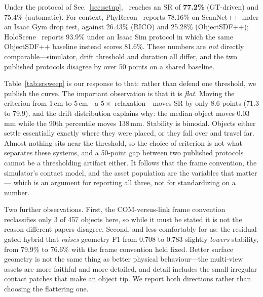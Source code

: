 \begin{table}[t]
\caption{Stability ratio vs.\ the drift threshold. The 3\,cm column is the
headline number; p50/p90 are the drift distribution's percentiles.}
\label{tab:srsweep}
\centering\small

\end{table}

Under the protocol of Sec.~\ref{sec:setup}, \name\ reaches an SR of
\textbf{77.2\%} (GT-driven) and 75.4\% (automatic). For context,
PhyRecon~\cite{phyrecon} reports 78.16\% on ScanNet++ under an Isaac Gym
drop test, against 26.43\% (RICO) and 25.28\% (ObjectSDF++);
HoloScene~\cite{holoscene} reports 93.9\% under an Isaac Sim protocol in
which the same ObjectSDF++ baseline instead scores 81.6\%. These numbers
are \emph{not} directly comparable---simulator, drift threshold and
duration all differ, and the two published protocols disagree by over 50
points on a shared baseline.

Table~\ref{tab:srsweep} is our response to that: rather than defend one
threshold, we publish the curve. The important observation is that it is
\emph{flat}. Moving the criterion from 1\,cm to 5\,cm---a $5\times$
relaxation---moves SR by only 8.6 points (71.3 to 79.9), and the drift
distribution explains why: the median object moves 0.03\,mm while the 90th
percentile moves 138\,mm. Stability is bimodal. Objects either settle
essentially exactly where they were placed, or they fall over and travel
far. Almost nothing sits near the threshold, so the choice of criterion is
not what separates these systems, and a 50-point gap between two published
protocols cannot be a thresholding artifact either. It follows that the
frame convention, the simulator's contact model, and the asset population
are the variables that matter --- which is an argument for reporting all
three, not for standardizing on a number.

Two further observations. First, the COM-versus-link frame convention
reclassifies only 3 of 457 objects here, so while it must be stated it is
not the reason different papers disagree. Second, and less comfortably for
us: the residual-gated hybrid that \emph{raises} geometry F1 from 0.708 to
0.783 slightly \emph{lowers} stability, from 79.9\% to 76.6\% with the
frame convention held fixed. Better surface geometry is not the same thing
as better physical behaviour---the multi-view assets are more faithful and
more detailed, and detail includes the small irregular contact patches
that make an object tip. We report both directions rather than choosing
the flattering one.

